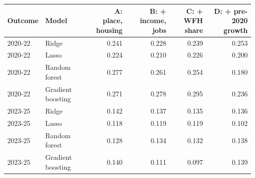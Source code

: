 \footnotesize\setlength{\tabcolsep}{4pt}
\begin{tabular}{llrrrr}
\toprule
Outcome & Model & \shortstack[r]{A: place,\\housing} & \shortstack[r]{B: + income,\\jobs} & \shortstack[r]{C: + WFH\\share} & \shortstack[r]{D: + pre-2020\\growth} \\
\midrule
2020-22 & Ridge & 0.241 & 0.228 & 0.239 & 0.253 \\
2020-22 & Lasso & 0.224 & 0.210 & 0.226 & 0.200 \\
2020-22 & Random forest & 0.277 & 0.261 & 0.254 & 0.180 \\
2020-22 & Gradient boosting & 0.271 & 0.278 & 0.295 & 0.236 \\
2023-25 & Ridge & 0.142 & 0.137 & 0.135 & 0.136 \\
2023-25 & Lasso & 0.118 & 0.119 & 0.119 & 0.102 \\
2023-25 & Random forest & 0.128 & 0.134 & 0.132 & 0.138 \\
2023-25 & Gradient boosting & 0.140 & 0.111 & 0.097 & 0.139 \\
\bottomrule
\end{tabular}
